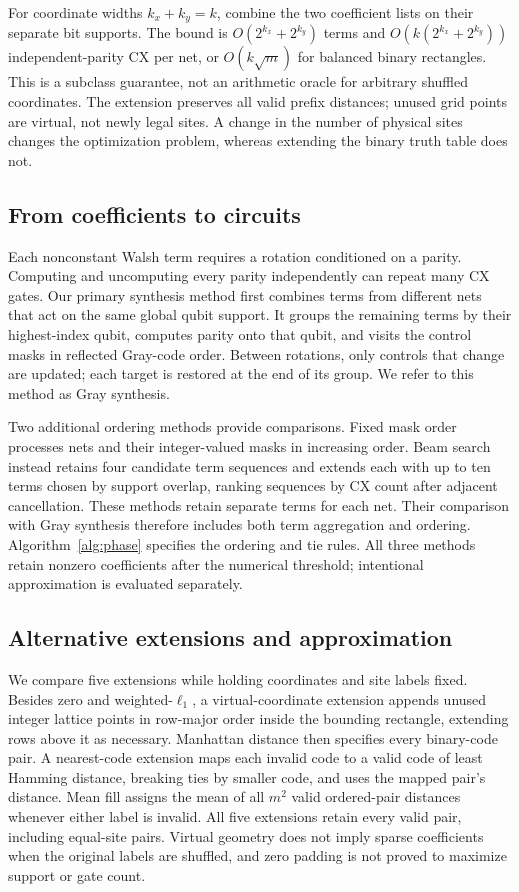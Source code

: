 For coordinate widths $k_x+k_y=k$, combine the two coefficient lists on their separate
bit supports. The bound is $O(2^{k_x}+2^{k_y})$ terms and
$O(k(2^{k_x}+2^{k_y}))$ independent-parity CX per net, or $O(k\sqrt m)$ for
balanced binary rectangles. This is a subclass guarantee, not an arithmetic
oracle for arbitrary shuffled coordinates. The extension preserves all
valid prefix distances; unused grid points are virtual, not newly legal sites.
A change in the number of physical sites changes the optimization problem,
whereas extending the binary truth table does not.

\subsection{From coefficients to circuits}
Each nonconstant Walsh term requires a rotation conditioned on a parity.
Computing and uncomputing every parity independently can repeat many CX
gates. Our primary synthesis method first combines terms from different
nets that act on the same global qubit support. It groups the remaining
terms by their highest-index qubit, computes parity onto that qubit, and
visits the control masks in reflected Gray-code order. Between rotations,
only controls that change are updated; each target is restored at the end
of its group. We refer to this method as Gray synthesis.

Two additional ordering methods provide comparisons. Fixed mask order
processes nets and their integer-valued masks in increasing order. Beam
search instead retains four candidate term sequences and extends each with
up to ten terms chosen by support overlap, ranking sequences by CX count
after adjacent cancellation. These methods retain separate terms for each
net. Their comparison with Gray synthesis therefore includes both term
aggregation and ordering. Algorithm~\ref{alg:phase} specifies the ordering
and tie rules. All three methods retain nonzero coefficients after the
numerical threshold; intentional approximation is evaluated separately.

\subsection{Alternative extensions and approximation}
\label{sec:extensions}
We compare five extensions while holding coordinates and site labels fixed. Besides zero and weighted-$\ell_1$, a virtual-coordinate extension
appends unused integer lattice points in row-major order inside the bounding
rectangle, extending rows above it as necessary. Manhattan distance then
specifies every binary-code pair. A nearest-code extension maps each invalid code
to a valid code of least Hamming distance, breaking ties by smaller code, and
uses the mapped pair's distance. Mean fill assigns the mean of all $m^2$ valid
ordered-pair distances whenever either label is invalid. All five extensions
retain every valid pair, including equal-site pairs. Virtual geometry does
not imply sparse coefficients when the original labels are shuffled, and zero
padding is not proved to maximize support or gate count.

